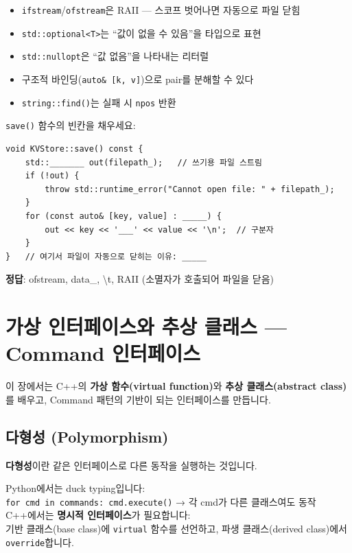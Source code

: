 \documentclass[11pt,a4paper]{book}
\newcommand{\code}[1]{\texttt{#1}}
\begin{document}
\begin{summarybox}
\begin{itemize}[nosep]
\item \code{ifstream}/\code{ofstream}은 RAII — 스코프 벗어나면 자동으로 파일 닫힘
\item \code{std::optional<T>}는 ``값이 없을 수 있음''을 타입으로 표현
\item \code{std::nullopt}은 ``값 없음''을 나타내는 리터럴
\item 구조적 바인딩(\code{auto\& [k, v]})으로 pair를 분해할 수 있다
\item \code{string::find()}는 실패 시 \code{npos} 반환
\end{itemize}
\end{summarybox}

\begin{quizbox}
\code{save()} 함수의 빈칸을 채우세요:

\begin{lstlisting}[style=cpp,numbers=none]
void KVStore::save() const {
    std::_______ out(filepath_);   // 쓰기용 파일 스트림
    if (!out) {
        throw std::runtime_error("Cannot open file: " + filepath_);
    }
    for (const auto& [key, value] : _____) {
        out << key << '___' << value << '\n';  // 구분자
    }
}   // 여기서 파일이 자동으로 닫히는 이유: _____
\end{lstlisting}

\textbf{정답}: ofstream, data\_, \textbackslash t, RAII (소멸자가 호출되어 파일을 닫음)
\end{quizbox}

\chapter{가상 인터페이스와 추상 클래스 — Command 인터페이스}
\label{ch:interface}

이 장에서는 C++의 \textbf{가상 함수(virtual function)}와 \textbf{추상 클래스(abstract class)}를 배우고, Command 패턴의 기반이 되는 인터페이스를 만듭니다.

\section{다형성 (Polymorphism)}

\textbf{다형성}이란 같은 인터페이스로 다른 동작을 실행하는 것입니다.

\begin{pythonbox}
Python에서는 duck typing입니다:\\
\code{for cmd in commands: cmd.execute()} → 각 cmd가 다른 클래스여도 동작\\[6pt]
C++에서는 \textbf{명시적 인터페이스}가 필요합니다:\\
기반 클래스(base class)에 \code{virtual} 함수를 선언하고, 파생 클래스(derived class)에서 \code{override}합니다.
\end{pythonbox}
\end{document}
